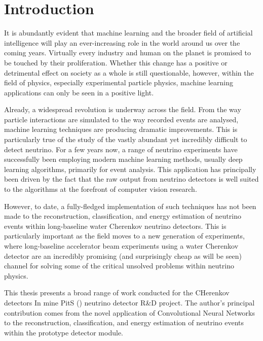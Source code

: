 \chapter{Introduction} %
\label{chap:introduction} %
\setcounter{page}{17}  %

It is abundantly evident that machine learning and the broader field of artificial intelligence
will play an ever-increasing role in the world around us over the coming years. Virtually every
industry and human on the planet is promised to be touched by their proliferation. Whether this
change has a positive or detrimental effect on society as a whole is still questionable, however,
within the field of physics, especially experimental particle physics, machine learning
applications can only be seen in a positive light.

Already, a widespread revolution is underway across the field. From the way particle interactions
are simulated to the way recorded events are analysed, machine learning techniques are producing
dramatic improvements. This is particularly true of the study of the vastly abundant yet
incredibly difficult to detect neutrino. For a few years now, a range of neutrino experiments have
successfully been employing modern machine learning methods, usually deep learning algorithms,
primarily for event analysis. This application has principally been driven by the fact that the
raw output from neutrino detectors is well suited to the algorithms at the forefront of computer
vision research.

However, to date, a fully-fledged implementation of such techniques has not been made to the
reconstruction, classification, and energy estimation of neutrino events within long-baseline
water Cherenkov neutrino detectors. This is particularly important as the field moves to a new
generation of experiments, where long-baseline accelerator beam experiments using a water
Cherenkov detector are an incredibly promising (and surprisingly cheap as will be seen) channel
for solving some of the critical unsolved problems within neutrino physics.

This thesis presents a broad range of work conducted for the CHerenkov detectors In mine PitS
(\chips) neutrino detector R\&D project. The author's principal contribution comes from the novel
application of Convolutional Neural Networks to the reconstruction, classification, and energy
estimation of neutrino events within the \chipsfive prototype detector module.

